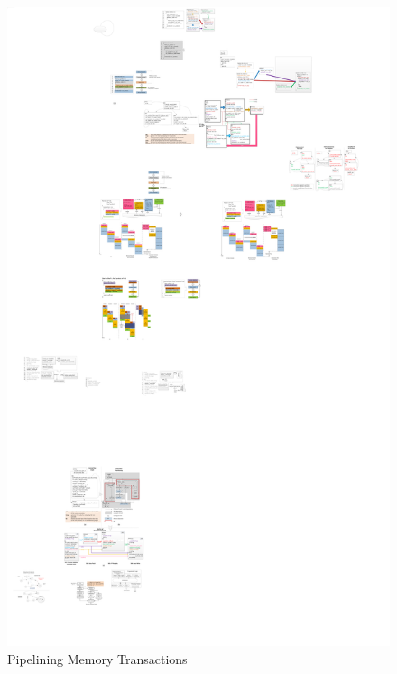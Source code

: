 \begin{figure}[htp]
\begin{center}
\includegraphics[width=1.0\linewidth]{chap3fig/memTrans2.pdf}
\caption{Pipelining Memory Transactions 
\label{fig:memTrans}}
\end{center}
\end{figure}

